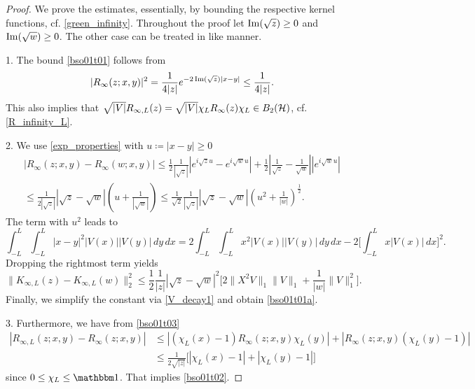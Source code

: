 \begin{proof}
We prove the estimates, essentially, by bounding the respective kernel functions, cf. \eqref{green_infinity}.
Throughout the proof let $\operatorname{Im}(\sqrt{z})\geq 0$ and $\operatorname{Im}(\sqrt{w})\geq 0$. The other case can be treated in like manner.

1.
The bound \eqref{bso01t01} follows from
\begin{equation}\label{bso01t03}
  |R_\infty(z;x,y)|^2 = \frac{1}{4|z|} e^{-2\operatorname{Im}(\sqrt{z})|x-y|}
                 \leq \frac{1}{4|z|} .
\end{equation}
This also implies that $\sqrt{|V|}R_{\infty,L}(z) = \sqrt{|V|}\chi_LR_\infty(z)\chi_L\in B_2({\mathcal H})$, cf. \eqref{R_infinity_L}.

2.
We use \eqref{exp_properties} with $u\coloneqq |x-y|\geq 0$
\begin{multline*}
   |R_\infty(z;x,y) - R_\infty(w;x,y)|
     \leq \frac{1}{2}\frac{1}{|\sqrt{z}|}|e^{i\sqrt{z}u}-e^{i\sqrt{w}u}| + \frac{1}{2}|\frac{1}{\sqrt{z}}-\frac{1}{\sqrt{w}}| |e^{i\sqrt{w}u}| \\
     \leq \frac{1}{2|\sqrt{z}|} |\sqrt{z}-\sqrt{w}| ( u + \frac{1}{|\sqrt{w}|} ) 
     \leq \frac{1}{\sqrt{2}}\frac{1}{|\sqrt{z}|} |\sqrt{z}-\sqrt{w}| ( u^2 + \frac{1}{|w|} )^{\frac{1}{2}} .
\end{multline*}
The term with $u^2$ leads to
\begin{equation*}
  \int_{-L}^L\int_{-L}^L |x-y|^2 |V(x)| |V(y)|\, dy \, dx
     = 2\int_{-L}^L\int_{-L}^L x^2 |V(x)| |V(y)|\, dy \, dx 
         - 2\Big[ \int_{-L}^L  x |V(x)| \, dx\Big]^2 .
\end{equation*}
Dropping the rightmost term yields
\begin{equation*}
  \| K_{\infty,L}(z) - K_{\infty,L}(w)\|_2^2
    \leq  \frac{1}{2}\frac{1}{|z|} |\sqrt{z}-\sqrt{w}|^2 \big[ 2 \|X^2V\|_1 \|V\|_1 + \frac{1}{|w|} \|V\|_1^2 \big] .
\end{equation*}
Finally, we simplify the constant via \eqref{V_decay1} and obtain \eqref{bso01t01a}.

3. Furthermore, we have from \eqref{bso01t03}
\begin{equation*}
\begin{split}
  |R_{\infty,L}(z;x,y) - R_\infty(z;x,y)|
    & \leq |(\chi_L(x)-1)R_\infty(z;x,y)\chi_L(y)| + |R_\infty(z;x,y)(\chi_L(y)-1)|\\
    & \leq \frac{1}{2\sqrt{|z|}} \big[  |\chi_L(x)-1| + |\chi_L(y)-1| \big]
\end{split}
\end{equation*}
since $0\leq\chi_L\leq\id$. That implies \eqref{bso01t02}.
\end{proof}

